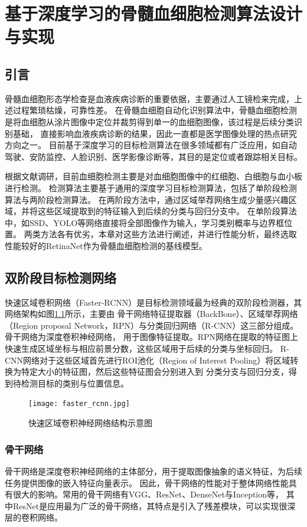 
\chapter{基于深度学习的骨髓血细胞检测算法设计与实现}
\section{引言}
骨髓血细胞形态学检查是血液疾病诊断的重要依据，主要通过人工镜检来完成，上述过程繁琐枯燥，可靠性差。
在骨髓血细胞自动化识别算法中，骨髓血细胞检测是将血细胞从涂片图像中定位并裁剪得到单一的血细胞图像，该过程是后续分类识别基础，
直接影响血液疾病诊断的结果，因此一直都是医学图像处理的热点研究方向之一。
目前基于深度学习的目标检测算法在很多领域都有广泛应用，如自动驾驶、安防监控、人脸识别、医学影像诊断等，其目的是定位或者跟踪相关目标。

根据文献调研，目前血细胞检测主要是对血细胞图像中的红细胞、白细胞与血小板进行检测。
检测算法主要基于通用的深度学习目标检测算法，包括了单阶段检测算法与两阶段检测算法。
在两阶段方法中，通过区域举荐网络生成少量感兴趣区域，并将这些区域提取到的特征输入到后续的分类与回归分支中。
在单阶段算法中，如SSD、YOLO等网络直接将全部图像作为输入，学习类别概率与边界框位置。
两类方法各有优劣，本章对这些方法进行阐述，并进行性能分析，最终选取性能较好的RetinaNet作为骨髓血细胞检测的基线模型。


\section{双阶段目标检测网络}
\label{section:faster-rcnn}
快速区域卷积网络（Faster-RCNN）是目标检测领域最为经典的双阶段检测器，其网络架构如图\ref{fig:faster_rcnn}所示，主要由
骨干网络特征提取器（BackBone）、区域举荐网络（Region proposal Network，RPN）与分类回归网络（R-CNN）这三部分组成。骨干网络为深度卷积神经网络，
用于图像特征提取。RPN网络在提取的特征图上快速生成区域坐标与相应前景分数，这些区域用于后续的分类与坐标回归。
R-CNN网络对于这些区域首先进行ROI池化（Region of Interest Pooling）将区域转换为特定大小的特征图，然后这些特征图会分别进入到
分类分支与回归分支，得到待检测目标的类别与位置信息。

\begin{figure}[htbp]  
   \centering   
   \texttt{[image: faster\_rcnn.jpg]}   
   \caption{快速区域卷积神经网络结构示意图}   
   \label{fig:faster_rcnn} 
\end{figure}  

\subsection{骨干网络}
骨干网络是深度卷积神经网络的主体部分，用于提取图像抽象的语义特征，为后续任务提供图像的嵌入特征向量表示。
因此，骨干网络的性能对于整体网络性能具有很大的影响。常用的骨干网络有VGG、ResNet、DenseNet与Inception等，
其中ResNet是应用最为广泛的骨干网络，其特点是引入了残差模块，可以实现很深层的卷积网络。

